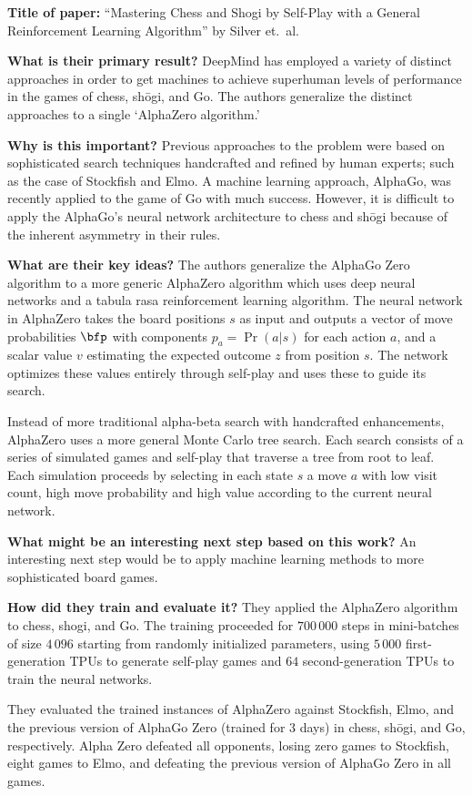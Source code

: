 \noindent \textbf{Title of paper:} ``Mastering Chess and Shogi by Self-Play with a General Reinforcement Learning Algorithm'' by Silver et.\ al.

\noindent\textbf{What is their primary result?} DeepMind has employed a variety
of distinct approaches in order to get machines to achieve superhuman levels of
performance in the games of chess, shōgi, and Go. The authors generalize the
distinct approaches to a single `AlphaZero algorithm.'

\noindent\textbf{Why is this important?} Previous approaches to the problem were
based on sophisticated search techniques handcrafted and refined by human
experts; such as the case of Stockfish and Elmo. A machine learning approach,
AlphaGo, was recently applied to the game of Go with much success. However, it
is difficult to apply the AlphaGo's neural network architecture to chess and
shōgi because of the inherent asymmetry in their rules.

\noindent\textbf{What are their key ideas?} The authors generalize the AlphaGo
Zero algorithm to a more generic AlphaZero algorithm which uses deep neural
networks and a tabula rasa reinforcement learning algorithm. The neural network
in AlphaZero takes the board positions $s$ as input and outputs a vector of move
probabilities $\bfp$ with components $p_a=\Pr(a|s)$ for each action $a$, and a
scalar value $v$ estimating the expected outcome $z$ from position $s$. The
network optimizes these values entirely through self-play and uses these to
guide its search.

Instead of more traditional alpha-beta search with handcrafted enhancements,
AlphaZero uses a more general Monte Carlo tree search. Each search consists of a
series of simulated games and self-play that traverse a tree from root to leaf.
Each simulation proceeds by selecting in each state $s$ a move $a$ with low
visit count, high move probability and high value according to the current
neural network.

\noindent\textbf{What might be an interesting next step based on this work?} An
interesting next step would be to apply machine learning methods to more
sophisticated board games.


\noindent\textbf{How did they train and evaluate it?} They applied the AlphaZero
algorithm to chess, shogi, and Go. The training proceeded for $700\,000$ steps
in mini-batches of size $4\,096$ starting from randomly initialized parameters,
using $5\,000$ first-generation TPUs to generate self-play games and $64$
second-generation TPUs to train the neural networks.
 
They evaluated the trained instances of AlphaZero against Stockfish, Elmo, and
the previous version of AlphaGo Zero (trained for $3$ days) in chess, shōgi, and
Go, respectively. Alpha Zero defeated all opponents, losing zero games to
Stockfish, eight games to Elmo, and defeating the previous version of AlphaGo
Zero in all games.


